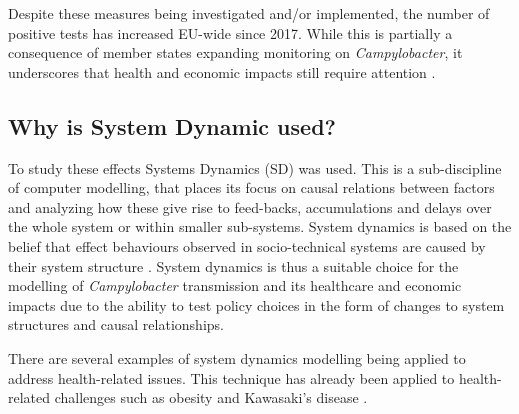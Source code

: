 Despite these measures being investigated and/or implemented, the number of positive tests has increased EU-wide since 2017. While this is partially a consequence of member states expanding monitoring on \textit{Campylobacter}, it underscores that health and economic impacts still require attention \parencite{nastasijevic_european_2020}.

\subsection*{Why is System Dynamic used?}

To study these effects Systems Dynamics (SD) was used. This is a sub-discipline of computer modelling, that places its focus on causal relations between factors and analyzing how these give rise to feed-backs, accumulations and delays over the whole system or within smaller sub-systems. System dynamics is based on the belief that effect behaviours observed in socio-technical systems are caused by their system structure \parencite{pruyt_triple_2013}. System dynamics is thus a suitable choice for the modelling of \textit{Campylobacter} transmission and its healthcare and economic impacts due to the ability to test policy choices in the form of changes to system structures and causal relationships.

There are several examples of system dynamics modelling being applied to address health-related issues. This technique has already been applied to health-related challenges such as obesity \parencite{chen_obesity_2018} and Kawasaki's disease \parencite{huang_epidemiology_2013}. 


